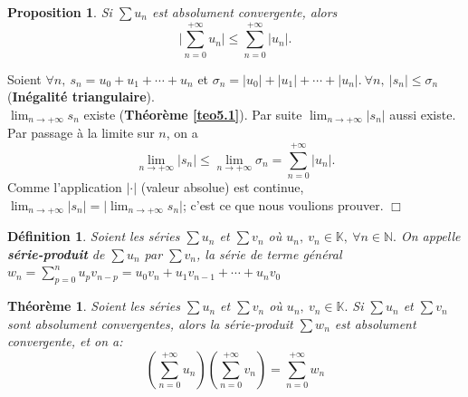 \documentclass[11pt, a4paper]{book}
\newtheorem{teo}{Th\'eor\`eme}[section]
\newtheorem{defi}{D\'efinition}[section]
\newtheorem{pro}{Proposition}[section]
\newenvironment{pr}{\noindent {\bf Preuve} \noindent} {\hfill $\Box$\vskip 5mm}
\begin{document}
\begin{pro} Si $\sum u_n$ est absolument convergente, alors $$\Big|\sum_{n=0}^{+\infty} u_n\Big|\leq \sum_{n=0}^{+\infty}|u_n|.$$ \end{pro}
\begin{pr}\quad Soient $\forall n, ~s_n=u_0+u_1+\cdots+u_n$ et $\sigma_n=|u_0|+|u_1|+\cdots+|u_n|. ~\forall n,~|s_n|\leq \sigma_n$ (\textbf{In\'egalit\'e triangulaire}).\\
${\displaystyle \lim_{n\rightarrow +\infty}s_n}$ existe (\textbf{Th\'eor\`eme \ref{teo5.1}}). Par suite ${\displaystyle\lim_{n\rightarrow +\infty}|s_n|}$ aussi existe. Par passage \`a la limite sur $n$, on a $$\lim_{n\rightarrow+\infty}|s_n| \leq \lim_{n\rightarrow+\infty}\sigma_n=\sum_{n=0}^{+\infty}|u_n|.$$ Comme l'application $|\cdot|$ (valeur absolue) est continue, ${\displaystyle \lim_{n\rightarrow+\infty}|s_n|=\Big|\lim_{n\rightarrow+\infty}s_n\Big|}$; c'est ce que nous voulions prouver.
\end{pr}
\begin{defi} Soient les s\'eries $\sum u_n$ et $\sum v_n$ o\`u $u_n,~v_n \in \mathbb{K}, ~\forall n \in \mathbb{N}.$ On appelle \textbf{s\'erie-produit} de $\sum u_n$ par $\sum v_n$, la s\'erie de terme g\'en\'eral ${\displaystyle w_n=\sum_{p=0}^n u_p v_{n-p}=u_0 v_n +u_1 v_{n-1}+\cdots+u_n v_0}$ \end{defi}
\begin{teo} \label{teo1.5.2}  Soient les s\'eries $\sum u_n$ et $\sum v_n$ o\`u $u_n,~v_n \in \mathbb{K}.$ Si $\sum u_n$ et $\sum v_n$ sont absolument convergentes, alors la s\'erie-produit $\sum w_n$ est absolument convergente, et on a: 
\begin{equation}
\left(\sum_{n=0}^{+\infty}u_n\right)\left(\sum_{n=0}^{+\infty}v_n\right)=\sum_{n=0}^{+\infty}w_n \label{eq1.1} 
\end{equation} 
\end{teo} 
\end{document}

